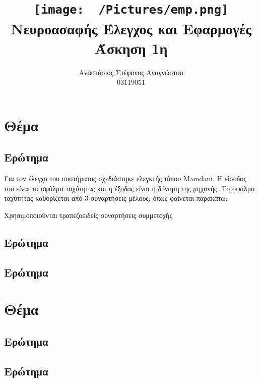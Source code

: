 \documentclass{article}
\title{
    \texttt{[image: ~/Pictures/emp.png]} \\
    \vskip 5cm
    Νευροασαφής Έλεγχος και Εφαρμογές\\
    \large Άσκηση 1η
    \vskip 5cm
}
\author{Αναστάσιος Στέφανος Αναγνώστου\\
        03119051}
\newcommand{\eng}[1]{\foreignlanguage{english}{#1}} %
\begin{document}
\maketitle
\newpage
\tableofcontents
\newpage

\section{Θέμα}

\subsection{Ερώτημα}

Για τον έλεγχο του συστήματος σχεδιάστηκε ελεγκτής τύπου \eng{Mamdani}. Η
είσοδος του είναι το σφάλμα ταχύτητας και η έξοδος είναι η δύναμη της μηχανής.
Το σφάλμα ταχύτητας καθορίζεται από 3 συναρτήσεις μέλους, όπως φαίνεται παρακάτω:

 

Χρησιμοποιούνται τραπεζοειδείς συναρτήσεις συμμετοχής

\subsection{Ερώτημα}

\subsection{Ερώτημα}

\section{Θέμα}

\subsection{Ερώτημα}

\subsection{Ερώτημα}
\end{document}
